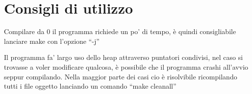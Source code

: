 \documentclass{report}
\begin{document}
\section{Consigli di utilizzo}

Compilare da 0 il programma richiede un po’ di tempo, è quindi consigliabile lanciare make con l’opzione “-j”


Il programma fa’ largo uso dello heap attraverso puntatori condivisi, nel caso si trovasse a voler modificare
qualcosa, è possibile che il programma crashi all’avvio seppur compilando.
Nella maggior parte dei casi cio è risolvibile ricompilando tutti i file oggetto lanciando un comando “make
cleanall”
\end{document}
